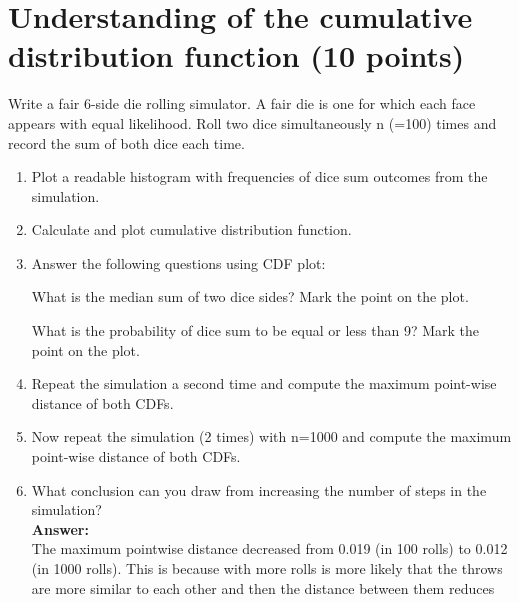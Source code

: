 \documentclass{WeSTassignment}
\begin{document}
\section{Understanding of the cumulative distribution function (10 points)}

Write a fair 6-side die rolling simulator. A fair die is one for which each face appears with equal likelihood. Roll two dice simultaneously n (=100) times and record the sum of both dice each time. 

\begin{enumerate}
\item Plot a readable histogram with frequencies of dice sum outcomes from the simulation. 
\item Calculate and plot cumulative distribution function.
\item Answer the following questions using CDF plot:

What is the median sum of two dice sides?  Mark the point on the plot.

What is the probability of dice sum to be equal or less than 9? Mark the point on the plot.

\item Repeat the simulation a second time and compute the maximum point-wise distance of both CDFs.
\item Now repeat the simulation (2 times) with n=1000 and compute the maximum point-wise distance of both CDFs.
\item What conclusion can you draw from increasing the number of steps in the simulation?  
\\ \textbf{Answer:}
\\ The maximum pointwise distance decreased from 0.019 (in 100 rolls) to 0.012 (in 1000 rolls). This is because with more rolls is more likely that the throws are more similar to each other and then the distance between them reduces 
\end{enumerate}
\end{document}
